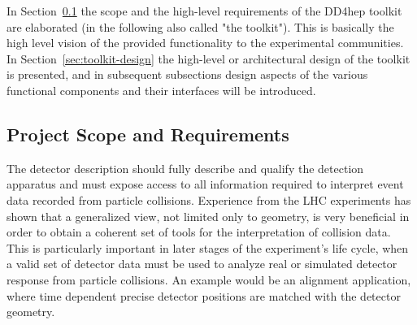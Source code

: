 \noindent
In Section~\ref{sec:architectural-concepts} the scope and the high-level 
requirements of the DD4hep toolkit are elaborated (in the following 
also called "the toolkit"). This is basically the high level vision 
of the provided functionality to the experimental communities. 
In Section~\ref{sec:toolkit-design} the high-level or architectural design 
of the toolkit is presented, and in subsequent subsections design 
aspects of the various functional components and their interfaces will be
introduced.

\subsection{Project Scope and Requirements}
\label{sec:architectural-concepts}
\noindent
The detector description should fully describe and qualify 
the detection apparatus and must expose access to all information
required to interpret event data recorded from particle collisions.
Experience from the LHC experiments has shown that a generalized
view, not limited only to geometry, is very beneficial in order to obtain 
a coherent set of tools for the interpretation of collision data.
This is particularly important in later stages of the experiment's life cycle,
when a valid set of detector data must be used to analyze real or simulated 
detector response from particle collisions. An example would be an alignment 
application, where time dependent precise detector positions are matched 
with the detector geometry.

